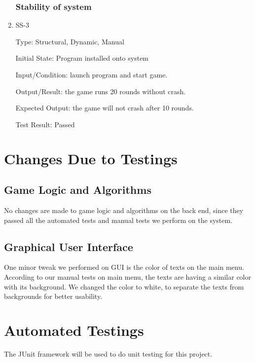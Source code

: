 \documentclass[12pt]{article}
\begin{document}
\begin{enumerate}
    \subsubsection{Stability of system}

    \item SS-3

    Type: Structural, Dynamic, Manual

    Initial State: Program installed onto system
    
    Input/Condition: launch program and start game.

    Output/Result: the game runs 20 rounds without crash.

    Expected Output: the game will not crash after 10 rounds.
	
	Test Result: Passed
	
	
	
	\end{enumerate}


\section{Changes Due to Testings}
\subsection{Game Logic and Algorithms}
No changes are made to game logic and algorithms on the back end, since they passed all the automated tests and manual tests we perform on the system.
\subsection{Graphical User Interface}
One minor tweak we performed on GUI is the color of texts on the main menu. According to our manual tests on main menu, the texts are having a similar color with its background. We changed the color to white, to separate the texts from backgrounds for better usability. 


	
							
				
\section{Automated Testings}
	The JUnit framework will be used to do unit testing for this project. 
		
\end{document}
